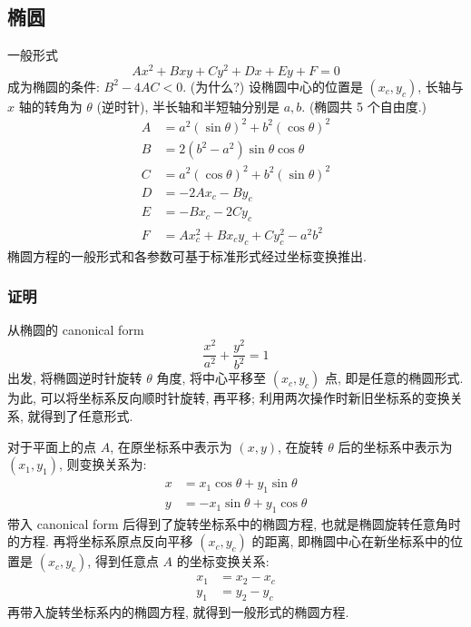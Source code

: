 \documentclass{book}
\numberwithin{equation}{section}
\numberwithin{figure}{section}
\theoremstyle{definition}
\begin{document}
\subsection{椭圆}
一般形式
\begin{equation*}
  Ax^2+Bxy+Cy^2+Dx+Ey+F=0
\end{equation*}
成为椭圆的条件: $B^2-4AC<0$. (为什么?)
设椭圆中心的位置是 $(x_c,y_c)$, 长轴与 $x$ 轴的转角为 $\theta$ (逆时针), 半长轴和半短轴分别是 $a,b$. (椭圆共 5 个自由度.) 
\begin{align*}
  A&=a^2(\sin\theta)^2+b^2(\cos\theta)^2\\
  B&=2(b^2-a^2)\sin\theta\cos\theta\\
  C&=a^2(\cos\theta)^2+b^2(\sin\theta)^2\\
  D&=-2Ax_c-By_c\\
  E&=-Bx_c-2Cy_c\\
  F&=Ax_c^2+Bx_cy_c+Cy_c^2-a^2b^2
\end{align*}
椭圆方程的一般形式和各参数可基于标准形式经过坐标变换推出.

\subsubsection{证明}
从椭圆的 canonical form
\begin{equation*}
  \frac{x^2}{a^2}+\frac{y^2}{b^2}=1
\end{equation*}
出发, 将椭圆逆时针旋转 $\theta$ 角度, 将中心平移至 $(x_c,y_c)$ 点, 即是任意的椭圆形式. 为此, 可以将坐标系反向顺时针旋转, 再平移; 利用两次操作时新旧坐标系的变换关系, 就得到了任意形式.

\begin{center}
\end{center}

对于平面上的点 $A$, 在原坐标系中表示为 $(x,y)$, 在旋转 $\theta$ 后的坐标系中表示为 $(x_1,y_1)$, 则变换关系为:
\begin{align*}
  x&=x_1\cos\theta+y_1\sin\theta\\
  y&=-x_1\sin\theta+y_1\cos\theta
\end{align*}
带入 canonical form 后得到了旋转坐标系中的椭圆方程, 也就是椭圆旋转任意角时的方程. 再将坐标系原点反向平移 $(x_c,y_c)$ 的距离, 即椭圆中心在新坐标系中的位置是 $(x_c,y_c)$, 得到任意点 $A$ 的坐标变换关系:
\begin{align*}
  x_1&=x_2-x_c\\
  y_1&=y_2-y_c
\end{align*}
再带入旋转坐标系内的椭圆方程, 就得到一般形式的椭圆方程.
\end{document}
